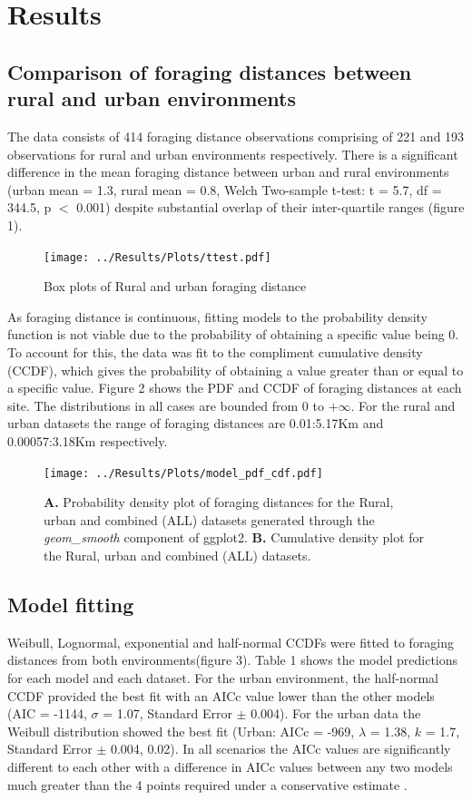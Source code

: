 \documentclass[11pt]{article}
\begin{document}
\section{Results}
\begin{linenumbers}

\subsection{Comparison of foraging distances between rural and urban environments}
The data consists of 414 foraging distance observations comprising of 221 and 193 observations for rural and urban environments respectively. There is a significant difference in the mean foraging distance between urban and rural environments (urban mean = 1.3, rural mean = 0.8, Welch Two-sample t-test: t = 5.7, df = 344.5, p $<$ 0.001) despite substantial overlap of their inter-quartile ranges (figure 1). 

\begin{figure}[H]
	\centering
	\texttt{[image: ../Results/Plots/ttest.pdf]}
	\caption{Box plots of Rural and urban foraging distance}
\end{figure}
\newpage
As foraging distance is continuous, fitting models to the probability density function is not viable due to the probability of obtaining a specific value being 0. To account for this, the data was fit to the compliment cumulative density (CCDF), which gives the probability of obtaining a value greater than or equal to a specific value. Figure 2 shows the PDF and CCDF of foraging distances at each site. The distributions in all cases are bounded from 0 to $+\infty$. For the rural and urban datasets the range of foraging distances are 0.01:5.17Km and 0.00057:3.18Km respectively. 

\newpage
\begin{figure}[H]
	\centering
	\texttt{[image: ../Results/Plots/model\_pdf\_cdf.pdf]}
	\caption{\textbf{A.} Probability density plot of foraging distances for the Rural, urban and combined (ALL) datasets generated through the \textit{geom\_smooth} component of ggplot2. \textbf{B.} Cumulative density plot for the Rural, urban and combined (ALL) datasets.}
\end{figure}

\subsection{Model fitting}
Weibull, Lognormal, exponential and half-normal CCDFs were fitted to foraging distances from both environments(figure 3). Table 1 shows the model predictions for each model and each dataset. For the urban environment, the half-normal CCDF provided the best fit with an AICc value lower than the other models (AIC = -1144, $\sigma$ = 1.07, Standard Error $\pm$ 0.004). For the urban data the Weibull distribution showed the best fit (Urban: AICc = -969, $\lambda$ = 1.38, $k$ = 1.7, Standard Error $\pm$ 0.004, 0.02). In all scenarios the AICc values are significantly different to each other with a difference in AICc values between any two models much greater than the 4 points required under a conservative estimate \citep{Burnham2004}. \\[1cm]


\end{linenumbers}
\end{document}
